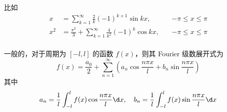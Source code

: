 比如
\[ \begin{aligned}
		x   & = \sum_{k=1}^{\infty} \frac{2}{k} (-1)^{k+1} \sin k x, \quad                   & -\pi \leqslant x \leqslant \pi \\
		x^2 & = \frac{\pi^2}{3} + \sum_{k=1}^{\infty} \frac{4}{k^2} (-1)^{k} \cos k x, \quad & -\pi \leqslant x \leqslant \pi \\
	\end{aligned} \]

一般的，对于周期为 $[-l,l]$ 的函数 $f(x)$，则其 Fourier 级数展开式为
\[ f(x) = \frac{a_0}{2} + \sum_{n=1}^{\infty} \left( a_n \cos \frac{n \pi x}{l} + b_n \sin \frac{n \pi x}{l} \right) \]
其中
\[ a_n = \frac{1}{l} \int_{-l}^{l} f(x) \cos \frac{n \pi x}{l} \d x, \quad b_n = \frac{1}{l} \int_{-l}^{l} f(x) \sin \frac{n \pi x}{l} \d x  \]
